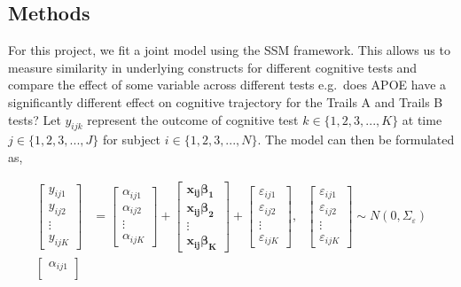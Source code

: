\documentclass[
]{article}
\author{}
\date{\vspace{-2.5em}}
\begin{document}
\hypertarget{methods}{%
\subsection{Methods}\label{methods}}

For this project, we fit a joint model using the SSM framework. This allows us to measure similarity in underlying constructs for different cognitive tests and compare the effect of some variable across different tests e.g.~does APOE have a significantly different effect on cognitive trajectory for the Trails A and Trails B tests? Let \(y_{ijk}\) represent the outcome of cognitive test \(k\in \{1, 2, 3, ..., K\}\) at time \(j\in \{1, 2, 3, ..., J\}\) for subject \(i \in \{1, 2, 3, ..., N\}\). The model can then be formulated as,

\begin{equation*}
\begin{aligned}
\begin{bmatrix}
y_{ij1}\\
y_{ij2}\\
\vdots\\
y_{ijK}
\end{bmatrix}
&= \begin{bmatrix}
\alpha_{ij1}\\
\alpha_{ij2}\\
\vdots\\
\alpha_{ijK}
\end{bmatrix}
+ 
\begin{bmatrix}
\boldsymbol{x_{ij}\beta_1}\\
\boldsymbol{x_{ij}\beta_2}\\
\vdots\\
\boldsymbol{x_{ij}\beta_K} 
\end{bmatrix} +
\begin{bmatrix}
\varepsilon_{ij1}\\
\varepsilon_{ij2}\\
\vdots\\
\varepsilon_{ijK}
\end{bmatrix}, \ \ \ 
\begin{bmatrix}
\varepsilon_{ij1}\\
\varepsilon_{ij2}\\
\vdots\\
\varepsilon_{ijK}
\end{bmatrix} 
\sim N(0, \Sigma_\varepsilon
)\\
\begin{bmatrix}
\alpha_{ij1}\\

\end{bmatrix}
\end{aligned}
\end{equation*}
\end{document}
